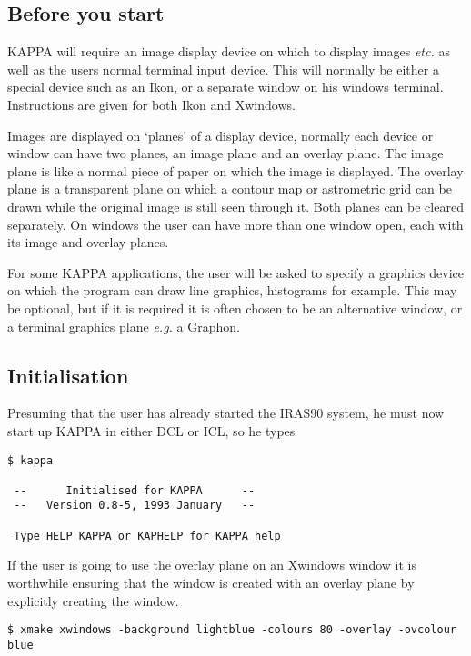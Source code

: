 \subsection{Before you start}
\label{k:before}
KAPPA will require an image display device on which to display images {\em
etc.} as
well as the users normal terminal input device. This will normally be either a 
special device such as an Ikon, or a separate window  on his windows 
terminal. Instructions are given for both Ikon and Xwindows.

Images are displayed on `planes' of a display device, normally each device
or window can have two planes, an image plane and an overlay plane. The image 
plane is like a normal piece of paper on which the image is displayed. The 
overlay plane is a transparent plane on which a contour map or astrometric grid
can be drawn while the original image is still seen through it. Both planes can
be cleared separately. On windows the user can have more than one window open,
each with its image and overlay planes.

For some KAPPA applications, the user will be asked to specify a graphics device
on which the program can draw line graphics, histograms for example. This may be
optional, but if it is required it is often chosen to be an alternative window,
or a terminal graphics plane {\em e.g.} a Graphon.
\subsection{Initialisation}
\label{k:init}
Presuming that the user has already started the IRAS90 system, he must now
start up KAPPA in either DCL or ICL, so he types

\begin{small}
\begin{verbatim}
$ kappa
 
 --      Initialised for KAPPA      -- 
 --   Version 0.8-5, 1993 January   -- 
 
 Type HELP KAPPA or KAPHELP for KAPPA help   
\end{verbatim}
\end{small}
If the user is going to use the overlay plane on an Xwindows window it is
worthwhile ensuring that the window is created with an overlay plane by
explicitly creating the window.
\begin{small}
\begin{verbatim}
$ xmake xwindows -background lightblue -colours 80 -overlay -ovcolour blue
\end{verbatim}
\end{small}

